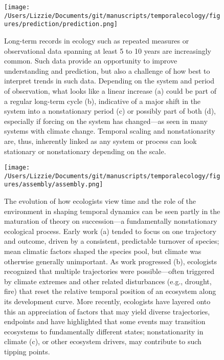 \documentclass[11pt,a4paper,oneside]{article}
\begin{document}
\begin{figure}[h!]
\centering
\noindent \texttt{[image: /Users/Lizzie/Documents/git/manuscripts/temporalecology/figures/prediction/prediction.png]}
\caption{Long-term records in ecology such as repeated measures or observational data spanning at least 5 to 10 years are increasingly common. Such data provide an opportunity to improve understanding and prediction, but also a challenge of how best to interpret trends in such data. Depending on the system and period of observation, what looks like a linear increase (a) could be part of a regular long-term cycle (b), indicative of a major shift in the system into a nonstationary period (c) or possibly part of both (d), especially if forcing on the system has changed---as seen in many systems with climate change. Temporal scaling and nonstationarity are, thus, inherently linked as any system or process can look stationary or nonstationary depending on the scale.}
\end{figure}

\newpage
\begin{figure}[h!]
\centering
\noindent \texttt{[image: /Users/Lizzie/Documents/git/manuscripts/temporalecology/figures/assembly/assembly.png]}
\caption{The evolution of how ecologists view time and the role of the environment in shaping temporal dynamics can be seen partly in the maturation of theory on succession---a fundamentally nonstationary ecological process. Early work (a) tended to focus on one trajectory and outcome, driven by a consistent, predictable turnover of species; mean climatic factors shaped the species pool, but climate was otherwise generally unimportant. As work progressed (b), ecologists recognized that multiple trajectories were possible---often triggered by climate extremes and other related disturbances (e.g., drought, fire) that reset the relative temporal position of an ecosystem along its development curve. More recently, ecologists have layered onto this an appreciation of factors that may yield diverse trajectories, endpoints and have highlighted that some events may transition ecosystems to fundamentally different states; nonstationarity in climate (c), or other ecosystem drivers, may contribute to such tipping points.}
\end{figure}
\end{document}
